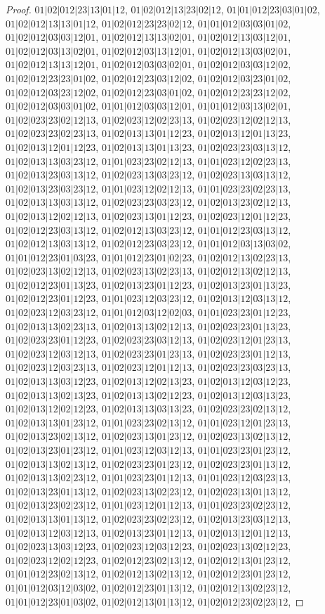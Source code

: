 \documentclass[12pt]{article}
\theoremstyle{plain}
\theoremstyle{definition}
\theoremstyle{remark}
\begin{document}
\begin{proof}
$01|02|012|23|13|01|12$, $01|02|012|13|23|02|12$, $01|01|012|23|03|01|02$, $01|02|012|13|13|01|12$, $01|02|012|23|23|02|12$, $01|01|012|03|03|01|02$, $01|02|012|03|03|12|01$, $01|02|012|13|13|02|01$, $01|02|012|13|03|12|01$, $01|02|012|03|13|02|01$, $01|02|012|03|13|12|01$, $01|02|012|13|03|02|01$, $01|02|012|13|13|12|01$, $01|02|012|03|03|02|01$, $01|02|012|03|03|12|02$, $01|02|012|23|23|01|02$, $01|02|012|23|03|12|02$, $01|02|012|03|23|01|02$, $01|02|012|03|23|12|02$, $01|02|012|23|03|01|02$, $01|02|012|23|23|12|02$, $01|02|012|03|03|01|02$, $01|01|012|03|03|12|01$, $01|01|012|03|13|02|01$, $01|02|023|23|02|12|13$, $01|02|023|12|02|23|13$, $01|02|023|12|02|12|13$, $01|02|023|23|02|23|13$, $01|02|013|13|01|12|23$, $01|02|013|12|01|13|23$, $01|02|013|12|01|12|23$, $01|02|013|13|01|13|23$, $01|02|023|23|03|13|12$, $01|02|013|13|03|23|12$, $01|01|023|23|02|12|13$, $01|01|023|12|02|23|13$, $01|02|013|23|03|13|12$, $01|02|023|13|03|23|12$, $01|02|023|13|03|13|12$, $01|02|013|23|03|23|12$, $01|01|023|12|02|12|13$, $01|01|023|23|02|23|13$, $01|02|013|13|03|13|12$, $01|02|023|23|03|23|12$, $01|02|013|23|02|12|13$, $01|02|013|12|02|12|13$, $01|02|023|13|01|12|23$, $01|02|023|12|01|12|23$, $01|02|012|23|03|13|12$, $01|02|012|13|03|23|12$, $01|01|012|23|03|13|12$, $01|02|012|13|03|13|12$, $01|02|012|23|03|23|12$, $01|01|012|03|13|03|02$, $01|01|012|23|01|03|23$, $01|01|012|23|01|02|23$, $01|02|012|13|02|23|13$, $01|02|023|13|02|12|13$, $01|02|023|13|02|23|13$, $01|02|012|13|02|12|13$, $01|02|012|23|01|13|23$, $01|02|013|23|01|12|23$, $01|02|013|23|01|13|23$, $01|02|012|23|01|12|23$, $01|01|023|12|03|23|12$, $01|02|013|12|03|13|12$, $01|02|023|12|03|23|12$, $01|01|012|03|12|02|03$, $01|01|023|23|01|12|23$, $01|02|013|13|02|23|13$, $01|02|013|13|02|12|13$, $01|02|023|23|01|13|23$, $01|02|023|23|01|12|23$, $01|02|023|23|03|12|13$, $01|02|023|12|01|23|13$, $01|02|023|12|03|12|13$, $01|02|023|23|01|23|13$, $01|02|023|23|01|12|13$, $01|02|023|12|03|23|13$, $01|02|023|12|01|12|13$, $01|02|023|23|03|23|13$, $01|02|013|13|03|12|23$, $01|02|013|12|02|13|23$, $01|02|013|12|03|12|23$, $01|02|013|13|02|13|23$, $01|02|013|13|02|12|23$, $01|02|013|12|03|13|23$, $01|02|013|12|02|12|23$, $01|02|013|13|03|13|23$, $01|02|023|23|02|13|12$, $01|02|013|13|01|23|12$, $01|01|023|23|02|13|12$, $01|01|023|12|01|23|13$, $01|02|013|23|02|13|12$, $01|02|023|13|01|23|12$, $01|02|023|13|02|13|12$, $01|02|013|23|01|23|12$, $01|01|023|12|03|12|13$, $01|01|023|23|01|23|12$, $01|02|013|13|02|13|12$, $01|02|023|23|01|23|12$, $01|02|023|23|01|13|12$, $01|02|013|13|02|23|12$, $01|01|023|23|01|12|13$, $01|01|023|12|03|23|13$, $01|02|013|23|01|13|12$, $01|02|023|13|02|23|12$, $01|02|023|13|01|13|12$, $01|02|013|23|02|23|12$, $01|01|023|12|01|12|13$, $01|01|023|23|02|23|12$, $01|02|013|13|01|13|12$, $01|02|023|23|02|23|12$, $01|02|013|23|03|12|13$, $01|02|013|12|03|12|13$, $01|02|013|23|01|12|13$, $01|02|013|12|01|12|13$, $01|02|023|13|03|12|23$, $01|02|023|12|03|12|23$, $01|02|023|13|02|12|23$, $01|02|023|12|02|12|23$, $01|02|012|23|02|13|12$, $01|02|012|13|01|23|12$, $01|01|012|23|02|13|12$, $01|02|012|13|02|13|12$, $01|02|012|23|01|23|12$, $01|01|012|03|12|03|02$, $01|02|012|23|01|13|12$, $01|02|012|13|02|23|12$, $01|01|012|23|01|03|02$, $01|02|012|13|01|13|12$, $01|02|012|23|02|23|12$, 
\end{proof}
\end{document}

